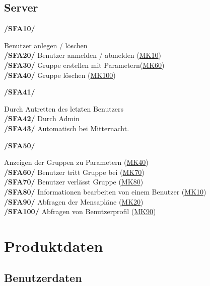 \documentclass[a4paper]{scrreprt}
\begin{document}
\section{Server}

\begin{addmargin}[25pt]{0pt} 
\hypertarget{sfa10}{\textbf{/SFA10/}} \hyperlink{benutzer}{Benutzer} anlegen / löschen\\
\hypertarget{sfa20}{\textbf{/SFA20/}} Benutzer anmelden / abmelden (\hyperlink{mk10}{MK10})\\
\hypertarget{sfa30}{\textbf{/SFA30/}} Gruppe erstellen mit Parametern(\hyperlink{mk60}{MK60})\\
\hypertarget{sfa40}{\textbf{/SFA40/}} Gruppe löschen (\hyperlink{mk100}{MK100})\\
	\begin{addmargin}[25pt]{0pt} 
	\hypertarget{sfa41}{\textbf{/SFA41/}} Durch Autretten des letzten Benutzers\\
	\hypertarget{sfa42}{\textbf{/SFA42/}} Durch Admin\\
	\hypertarget{sfa43}{\textbf{/SFA43/}} Automatisch bei Mitternacht.\\
	\end{addmargin}
\hypertarget{sfa50}{\textbf{/SFA50/}} Anzeigen der Gruppen zu Parametern (\hyperlink{m40}{MK40})\\
\hypertarget{sfa60}{\textbf{/SFA60/}} Benutzer tritt Gruppe bei (\hyperlink{m70}{MK70})\\
\hypertarget{sfa70}{\textbf{/SFA70/}} Benutzer verlässt Gruppe (\hyperlink{m80}{MK80})\\
\hypertarget{sfa80}{\textbf{/SFA80/}} Informationen bearbeiten von einem Benutzer (\hyperlink{m10}{MK10})\\
\hypertarget{sfa90}{\textbf{/SFA90/}} Abfragen der Mensapläne (\hyperlink{m20}{MK20})\\
\hypertarget{sfa100}{\textbf{/SFA100/}} Abfragen von Benutzerprofil (\hyperlink{m90}{MK90})\\
\end{addmargin}

\chapter{Produktdaten}

\section{Benutzerdaten}
\end{document}
